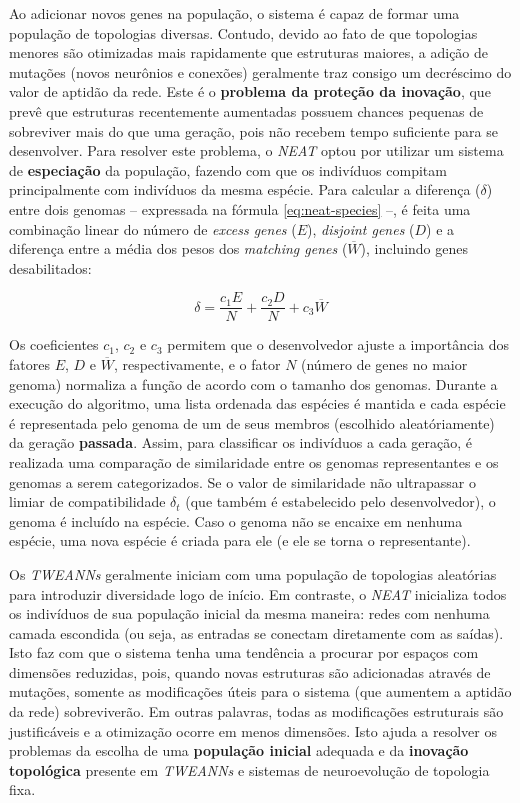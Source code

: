 Ao adicionar novos genes na população, o sistema é capaz de formar uma população
de topologias diversas. Contudo, devido ao fato de que topologias menores são
otimizadas mais rapidamente que estruturas maiores, a adição de mutações (novos
neurônios e conexões) geralmente traz consigo um decréscimo do valor de aptidão
da rede. Este é o \textbf{problema da proteção da inovação}, que prevê que
estruturas recentemente aumentadas possuem chances pequenas de sobreviver mais
do que uma geração, pois não recebem tempo suficiente para se desenvolver. Para
resolver este problema, o \textit{NEAT} optou por utilizar um sistema de
\textbf{especiação} da população, fazendo com que os indivíduos compitam
principalmente com indivíduos da mesma espécie. Para calcular a diferença
($\delta$) entre dois genomas -- expressada na fórmula \ref{eq:neat-species}
--, é feita uma combinação linear do número de \textit{excess genes} ($E$),
\textit{disjoint genes} ($D$) e a diferença entre a média dos pesos dos
\textit{matching genes} ($\overline{W}$), incluindo genes desabilitados:	

\begin{equation}
\label{eq:neat-species}
\delta = \frac{c_1E}{N} + \frac{c_2D}{N} + c_3\overline{W}
\end{equation}

Os coeficientes $c_1$, $c_2$ e $c_3$ permitem que o desenvolvedor ajuste a
importância dos fatores $E$, $D$ e $\overline{W}$, respectivamente, e o fator
$N$ (número de genes no maior genoma) normaliza a função de acordo com o tamanho
dos genomas. Durante a execução do algoritmo, uma lista ordenada das espécies é
mantida e cada espécie é representada pelo genoma de um de seus membros
(escolhido aleatóriamente) da geração \textbf{passada}. Assim, para classificar
os indivíduos a cada geração, é realizada uma comparação de similaridade entre
os genomas representantes e os genomas a serem categorizados. Se o valor de
similaridade não ultrapassar o limiar de compatibilidade $\delta_t$ (que também
é estabelecido pelo desenvolvedor), o genoma é incluído na espécie. Caso o
genoma não se encaixe em nenhuma espécie, uma nova espécie é criada para ele (e
ele se torna o representante).

Os \textit{TWEANNs} geralmente iniciam com uma população de topologias
aleatórias para introduzir diversidade logo de início. Em contraste, o
\textit{NEAT} inicializa todos os indivíduos de sua população inicial da mesma
maneira: redes com nenhuma camada escondida (ou seja, as entradas se conectam
diretamente com as saídas). Isto faz com que o sistema tenha uma tendência a
procurar por espaços com dimensões reduzidas, pois, quando novas estruturas são
adicionadas através de mutações, somente as modificações úteis para o sistema
(que aumentem a aptidão da rede) sobreviverão. Em outras palavras, todas as
modificações estruturais são justificáveis e a otimização ocorre em menos
dimensões. Isto ajuda a resolver os problemas da escolha de uma
\textbf{população inicial} adequada e da \textbf{inovação topológica} presente
em \textit{TWEANNs} e sistemas de neuroevolução de topologia fixa.


